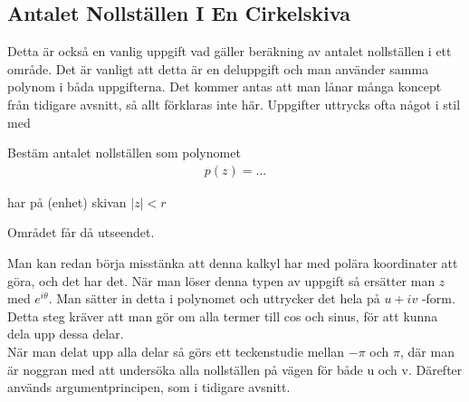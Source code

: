 \subsection{Antalet Nollställen I En Cirkelskiva}
Detta är också en vanlig uppgift vad gäller beräkning av antalet nollställen i ett område. Det är vanligt att detta är en deluppgift och man använder samma polynom i båda uppgifterna. Det kommer antas att man lånar många koncept från tidigare avsnitt, så allt förklaras inte här. Uppgifter uttrycks ofta något i stil med

\begin{tcolorbox}

Bestäm antalet nollställen som polynomet 
\begin{align*}
	p(z) = ...
\end{align*}

	har på (enhet) skivan $|z| < r$

\end{tcolorbox}
Området får då utseendet. 
\begin{center}
\end{center}
Man kan redan börja misstänka att denna kalkyl har med polära koordinater att göra, och det har det. När man löser denna typen av uppgift så ersätter man $z$ med $e^{i \theta}$. Man sätter in detta i polynomet och uttrycker det hela på $u + iv$ -form. Detta steg kräver att man gör om alla termer till cos och sinus, för att kunna dela upp dessa delar. \\

När man delat upp alla delar så görs ett teckenstudie mellan $-\pi$ och $\pi$, där man är noggran med att undersöka alla nollställen på vägen för både u och v. Därefter används argumentprincipen, som i tidigare avsnitt.  
